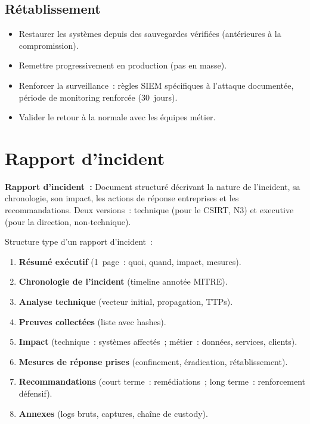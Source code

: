 \subsection{Rétablissement}

\begin{itemize}
  \item Restaurer les systèmes depuis des sauvegardes vérifiées
        (antérieures à la compromission).
  \item Remettre progressivement en production (pas en masse).
  \item Renforcer la surveillance~: règles SIEM spécifiques à l'attaque
        documentée, période de monitoring renforcée (30~jours).
  \item Valider le retour à la normale avec les équipes métier.
\end{itemize}

\section{Rapport d'incident}
\label{sec:rapport-incident}

\begin{boxdef}
\textbf{Rapport d'incident~:} Document structuré décrivant la nature
de l'incident, sa chronologie, son impact, les actions de réponse
entreprises et les recommandations. Deux versions~: technique (pour le
CSIRT, N3) et executive (pour la direction, non-technique).
\end{boxdef}

Structure type d'un rapport d'incident~:
\begin{enumerate}
  \item \textbf{Résumé exécutif} (1~page~: quoi, quand, impact, mesures).
  \item \textbf{Chronologie de l'incident} (timeline annotée MITRE).
  \item \textbf{Analyse technique} (vecteur initial, propagation, TTPs).
  \item \textbf{Preuves collectées} (liste avec hashes).
  \item \textbf{Impact} (technique~: systèmes affectés~; métier~:
        données, services, clients).
  \item \textbf{Mesures de réponse prises} (confinement, éradication,
        rétablissement).
  \item \textbf{Recommandations} (court terme~: remédiations~;
        long terme~: renforcement défensif).
  \item \textbf{Annexes} (logs bruts, captures, chaîne de custody).
\end{enumerate}

